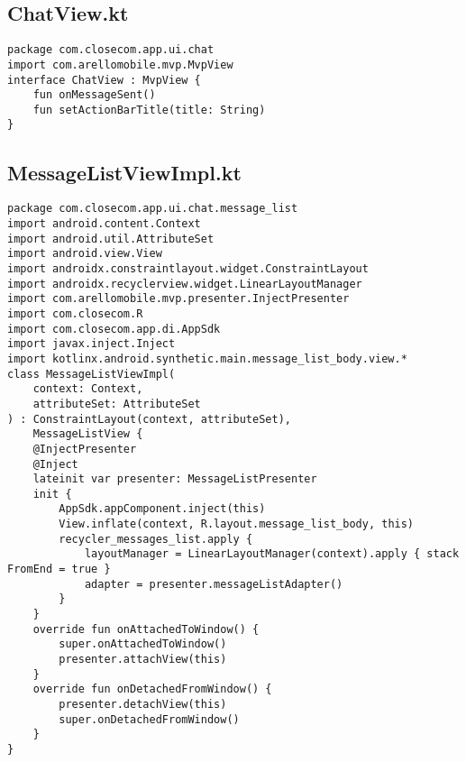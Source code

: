 \documentclass[listing]{espd}
\begin{document}
\subsection{ChatView.kt}
\begin{verbatim}
package com.closecom.app.ui.chat
import com.arellomobile.mvp.MvpView
interface ChatView : MvpView {
    fun onMessageSent()
    fun setActionBarTitle(title: String)
}
\end{verbatim}

\subsection{MessageListViewImpl.kt}
\begin{verbatim}
package com.closecom.app.ui.chat.message_list
import android.content.Context
import android.util.AttributeSet
import android.view.View
import androidx.constraintlayout.widget.ConstraintLayout
import androidx.recyclerview.widget.LinearLayoutManager
import com.arellomobile.mvp.presenter.InjectPresenter
import com.closecom.R
import com.closecom.app.di.AppSdk
import javax.inject.Inject
import kotlinx.android.synthetic.main.message_list_body.view.*
class MessageListViewImpl(
    context: Context,
    attributeSet: AttributeSet
) : ConstraintLayout(context, attributeSet),
    MessageListView {
    @InjectPresenter
    @Inject
    lateinit var presenter: MessageListPresenter
    init {
        AppSdk.appComponent.inject(this)
        View.inflate(context, R.layout.message_list_body, this)
        recycler_messages_list.apply {
            layoutManager = LinearLayoutManager(context).apply { stack
FromEnd = true }
            adapter = presenter.messageListAdapter()
        }
    }
    override fun onAttachedToWindow() {
        super.onAttachedToWindow()
        presenter.attachView(this)
    }
    override fun onDetachedFromWindow() {
        presenter.detachView(this)
        super.onDetachedFromWindow()
    }
}
\end{verbatim}
\end{document}
